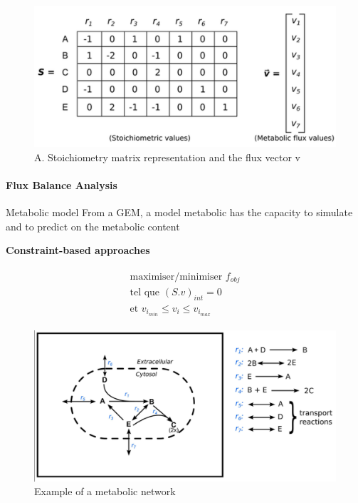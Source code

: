 \documentclass[8pt,usenames,dvipsnames]{beamer}
\begin{document}
\begin{frame}
{\begin{minipage}{0.5\textwidth}
\end{minipage}%
\begin{minipage}{0.5\textwidth}
\begin{figure}
\includegraphics[width=\textwidth]{figures/mass-balance-2}
\caption{A. Stoichiometry matrix representation and the flux vector v}
\end{figure}

\end{minipage}

}

 {

\framesubtitle{Flux Balance Analysis}

\begin{exampleblock}{Metabolic model}
From a GEM, a model metabolic has the capacity to simulate and to predict on the metabolic content
\end{exampleblock}
\textbf{Constraint-based approaches}
\begin{minipage}{0.5\textwidth}

\begin{align*}
\begin{split}
    \text{maximiser/minimiser }\text{$f_{obj}$} \\
    \text{tel que } (S.v)_{int} = 0\\
    \text{et } \text{$v_{i_{min}}$} \leq v_i \leq \text{$v_{i_{max}}$}
\end{split}
\end{align*}

\begin{figure}
\includegraphics[width=\textwidth]{figures/mass-balance-1}
\vspace{-0.5cm}\caption{Example of a metabolic network}
\end{figure}


\end{minipage}}
\end{frame}
\end{document}
